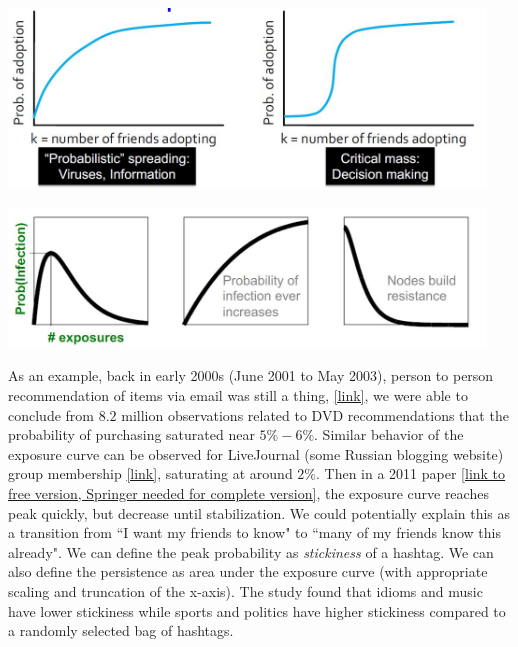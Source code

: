 {
\centering
\includegraphics[width=0.95\textwidth]{notes/img/l13_p44_exposure.JPG} \par
}

{
\centering
\includegraphics[width=0.95\textwidth]{notes/img/l13_p45_adoption.JPG} \par
}

As an example, back in early 2000s (June 2001 to May 2003), person to person recommendation of items via email was still a thing, \href{https://cs.stanford.edu/people/jure/pubs/viral-tweb.pdf}{[link]}, we were able to conclude from $8.2$ million observations related to DVD recommendations that the probability of purchasing saturated near $5\% - 6\%$. Similar behavior of the exposure curve can be observed for LiveJournal (some Russian blogging website) group membership \href{https://www.cs.cornell.edu/~lars/kdd06-comm.pdf}{[link]}, saturating at around $2\%$. Then in a 2011 paper \href{http://ra.ethz.ch/CDstore/www2011/companion/p113.pdf}{[link to free version, Springer needed for complete version]}, the exposure curve reaches peak quickly, but decrease until stabilization. We could potentially explain this as a transition from ``I want my friends to know" to ``many of my friends know this already". We can define the peak probability as \textit{stickiness} of a hashtag. We can also define the persistence as area under the exposure curve (with appropriate scaling and truncation of the x-axis). The study found that idioms and music have lower stickiness while sports and politics have higher stickiness compared to a randomly selected bag of hashtags.

